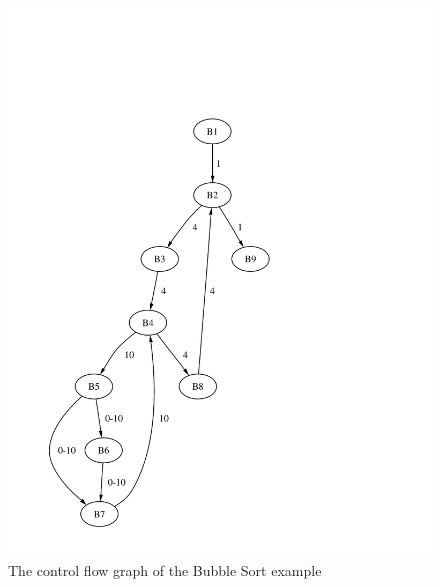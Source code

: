 \begin{figure}
    \centering
    \includegraphics[height=\excelwidth]{results/results_wcet_cfg}
    \caption{The control flow graph of the Bubble Sort example}
    \label{fig:results:wcet:cfg}
\end{figure}



%    



